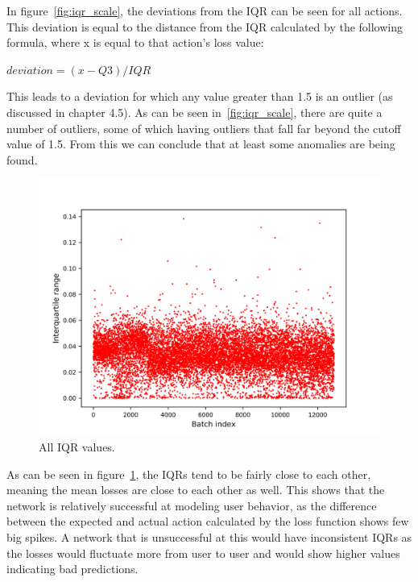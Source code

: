 In figure~\ref{fig:iqr_scale}, the deviations from the IQR can be seen for all actions. This deviation is equal to the distance from the IQR calculated by the following formula, where x is equal to that action's loss value:

\( deviation = (x - Q3) / IQR \)

This leads to a deviation for which any value greater than 1.5 is an outlier (as discussed in chapter 4.5). As can be seen in~\ref{fig:iqr_scale}, there are quite a number of outliers, some of which having outliers that fall far beyond the cutoff value of 1.5. From this we can conclude that at least some anomalies are being found. 

\begin{figure}
	\begin{center}
		\includegraphics[scale=0.1]{evaluation/iqrs}
	\end{center}
	\caption{All IQR values.~\label{fig:iqrs}}
\end{figure}

As can be seen in figure~\ref{fig:iqrs}, the IQRs tend to be fairly close to each other, meaning the mean losses are close to each other as well. This shows that the network is relatively successful at modeling user behavior, as the difference between the expected and actual action calculated by the loss function shows few big spikes. A network that is unsuccessful at this would have inconsistent IQRs as the losses would fluctuate more from user to user and would show higher values indicating bad predictions.

